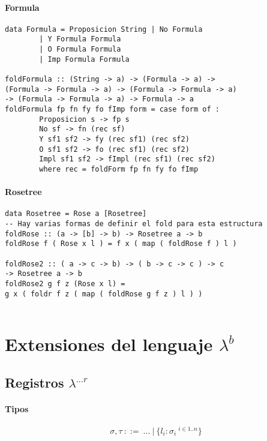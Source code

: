 \paragraph{Formula}
\begin{centrado}
	\begin{verbatim}
data Formula = Proposicion String | No Formula 
		| Y Formula Formula
		| O Formula Formula
		| Imp Formula Formula
		
foldFormula :: (String -> a) -> (Formula -> a) -> 
(Formula -> Formula -> a) -> (Formula -> Formula -> a) 
-> (Formula -> Formula -> a) -> Formula -> a
foldFormula fp fn fy fo fImp form = case form of :
		Proposicion s -> fp s
		No sf -> fn (rec sf)
		Y sf1 sf2 -> fy (rec sf1) (rec sf2)
		O sf1 sf2 -> fo (rec sf1) (rec sf2)
		Impl sf1 sf2 -> fImpl (rec sf1) (rec sf2)
		where rec = foldForm fp fn fy fo fImp
	\end{verbatim}
\end{centrado}

\paragraph{Rosetree}
\begin{centrado}
	\begin{verbatim}
data Rosetree = Rose a [Rosetree]
-- Hay varias formas de definir el fold para esta estructura
foldRose :: (a -> [b] -> b) -> Rosetree a -> b
foldRose f ( Rose x l ) = f x ( map ( foldRose f ) l )
		
foldRose2 :: ( a -> c -> b) -> ( b -> c -> c ) -> c 
-> Rosetree a -> b
foldRose2 g f z (Rose x l) = 
g x ( foldr f z ( map ( foldRose g f z ) l ) )
		
	\end{verbatim}
\end{centrado}


\newpage
\section{Extensiones del lenguaje \texorpdfstring{\(\lambda^b\)}{lambda b}}



\subsection{Registros \texorpdfstring{\(\lambda^{...r}\)}{lambda ...r}}

\paragraph{Tipos}
\[\sigma, \tau ~::=~...~|~\{l_i : \sigma_i ~^{i\in 1..n}\}\]

